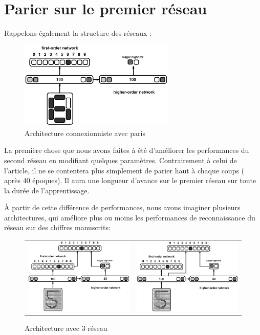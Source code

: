 \documentclass[a4paper,12pt]{article}
\begin{document}
\section{Parier sur le premier réseau}

Rappelons également la structure des réseaux :
\begin{figure}[h]
\begin{center}
 \includegraphics[width=280px]{../cleeremans_2007/digital_reco/schema.png}
\end{center}
 \caption{ \cite{Cleeremans_2007}  Architecture connexionniste avec paris  }
\end{figure}


La première chose que nous avons faites à été d'améliorer les performances du second réseau
en modifiant quelques paramètres. Contrairement à celui de l'article, il ne se contentera 
plus simplement de parier haut à chaque coups ( après 40 époques). Il aura une longueur d'avance
sur le premier réseau sur toute la durée de l'apprentissage.

À partir de cette différence de performances, nous avons imaginer plusieurs architectures, qui
améliore plus ou moins les performances de reconnaissance du réseau sur des chiffres manuscrits:

\begin{figure}[h]
 \begin{center}
\begin{tabular}{c|c}
 \includegraphics[width=210px]{../pre-presentation/thrid.png} & 
 \includegraphics[width=210px]{../pre-presentation/thrid_hidden.png}
\end{tabular}
\end{center}
\caption{Architecture avec 3 réseau}
\end{figure}
\end{document}
